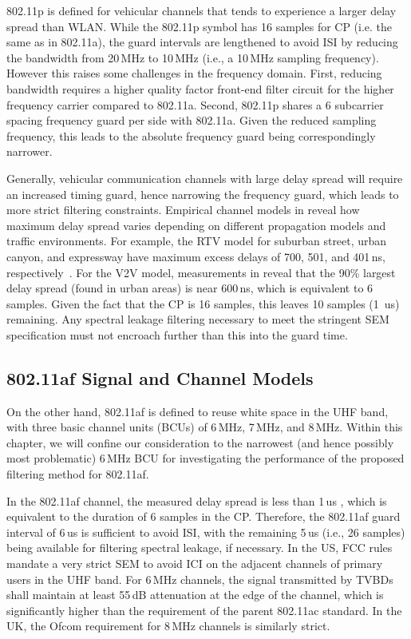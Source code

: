 802.11p is defined for vehicular channels that tends to experience a larger delay spread than WLAN.
While the 802.11p symbol has 16 samples for CP (i.e. the same as in 802.11a), the guard intervals are lengthened to avoid ISI by reducing the bandwidth from 20\,MHz to 10\,MHz (i.e., a 10\,MHz sampling frequency). However this raises some challenges in the frequency domain.
First, reducing bandwidth requires a higher quality factor front-end filter circuit for the higher frequency carrier compared to 802.11a.
Second, 802.11p shares a 6 subcarrier spacing frequency guard per side with 802.11a. Given the reduced sampling frequency, this leads to the absolute frequency guard being correspondingly narrower.

Generally, vehicular communication channels with large delay spread will require an increased timing guard, hence narrowing the frequency guard, which leads to more strict filtering constraints.
Empirical channel models in \cite{Acosta-Marum2007,Sen2008} reveal how maximum delay spread varies depending on different propagation models and traffic environments.
For example, the RTV model for suburban street, urban canyon, and expressway have maximum excess delays of 700, 501, and 401\,ns, respectively~\cite{Acosta-Marum2007}.
For the V2V model, measurements in \cite{Sen2008} reveal that the 90\% largest delay spread (found in urban areas) is near 600\,ns, which is equivalent to 6 samples.
Given the fact that the CP is 16 samples, this leaves 10 samples (1~us) remaining. Any spectral leakage filtering necessary to meet the stringent SEM specification must not encroach further than this into the guard time.

\subsection{802.11af Signal and Channel Models}

On the other hand, 802.11af is defined to reuse white space in the UHF band, with three basic channel units (BCUs) of 6\,MHz, 7\,MHz, and 8\,MHz.
Within this chapter, we will confine our consideration to the narrowest (and hence possibly most problematic) 6\,MHz BCU for investigating the performance of the proposed filtering method for 802.11af.

In the 802.11af channel, the measured delay spread is less than 1\,us \cite{Lan2013}, which  is equivalent to the duration of 6 samples in the CP.
Therefore, the 802.11af guard interval of 6\,us is sufficient to avoid ISI, with the remaining 5\,us (i.e., 26 samples) being available for filtering spectral leakage, if necessary.
In the US, FCC rules mandate a very strict SEM to avoid ICI on the adjacent channels of primary users in the UHF band.
For 6\,MHz channels, the signal transmitted by TVBDs shall maintain at least 55\,dB attenuation at the edge of the channel, which is significantly higher than the requirement of the parent 802.11ac standard. In the UK, the Ofcom requirement for 8\,MHz channels is similarly strict.


